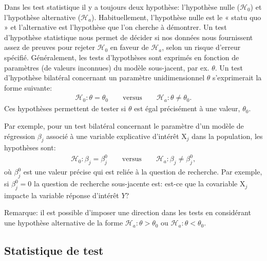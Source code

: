 \documentclass[
  11pt,
  letterpaper,
]{book}
\begin{document}
Dans les test statistique il y a toujours deux hypothèse: l'hypothèse nulle (\(\mathscr{H}{}_{0}\)) et l'hypothèse alternative (\(\mathscr{H}_a\)). Habituellement, l'hypothèse nulle est le « statu quo » et l'alternative est l'hypothèse que l'on cherche à démontrer. Un test d'hypothèse statistique nous permet de décider si nos données nous fournissent assez de preuves pour rejeter \(\mathscr{H}_0\) en faveur de \(\mathscr{H}_a\), selon un risque d'erreur spécifié. Généralement, les tests d'hypothèses sont exprimés en fonction de paramètres (de valeurs inconnues) du modèle sous-jacent, par ex. \(\theta\). Un test d'hypothèse bilatéral concernant un paramètre unidimensionnel \(\theta\) s'exprimerait la forme suivante:
\begin{align*}
\mathscr{H}_0: \theta=\theta_0 \qquad \text{versus} \qquad \mathscr{H}_a:\theta \neq \theta_0.
\end{align*}
Ces hypothèses permettent de tester si \(\theta\) est égal précisément à une valeur, \(\theta_0\).

Par exemple, pour un test bilatéral concernant le paramètre d'un modèle de régression \(\beta_j\) associé à une variable explicative d'intérêt \(\mathrm{X}_j\) dans la population, les hypothèses sont:
\begin{align*}
\mathscr{H}_0: \beta_j=\beta_j^0 \qquad \text{versus} \qquad \mathscr{H}_a:\beta_j \neq \beta_j^0, 
\end{align*}
où \(\beta_j^0\) est une valeur précise qui est reliée à la question de recherche. Par exemple, si \(\beta_j^0=0\) la question de recherche sous-jacente est: est-ce que la covariable \(\mathrm{X}_j\) impacte la variable réponse d'intérêt \(Y\)?

Remarque: il est possible d'imposer une direction dans les tests en considérant une hypothèse alternative de la forme \(\mathscr{H}_a: \theta > \theta_0\) ou \(\mathscr{H}_a: \theta < \theta_0\).

\hypertarget{statistique-de-test}{%
\subsection{Statistique de test}\label{statistique-de-test}}
\end{document}
